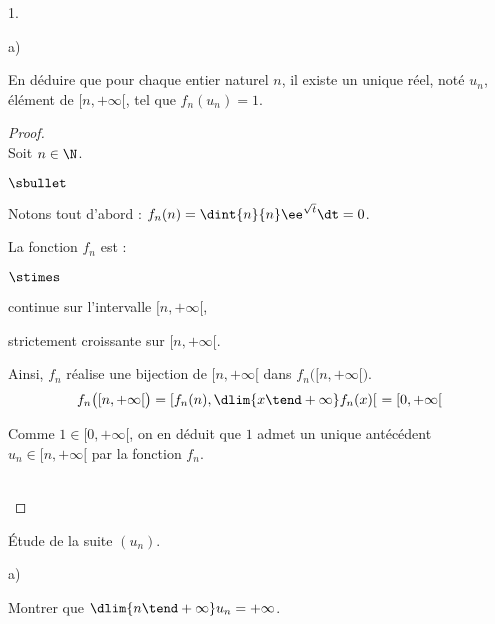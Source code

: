\documentclass[11pt]{article}%
\begin{document}
\begin{noliste}{1.}
\begin{noliste}{a)}
  \item En déduire que pour chaque entier naturel $n$, il existe un
    unique réel, noté $u_n$, élément de $[n, + \infty[$, tel que
    $f_{n}(u_n) = 1$.

    \begin{proof}~\\
      Soit $n \in \N$.
      \begin{noliste}{$\sbullet$}
      \item Notons tout d'abord : $f_n(n) = \dint{n}{n}
        \ee^{\sqrt{t}}\dt = 0$.

      \item La fonction $f_n$ est :
        \begin{noliste}{$\stimes$}
        \item continue sur l'intervalle $[n,+\infty[$,
        \item strictement croissante sur $[n,+\infty[$.
        \end{noliste}
        Ainsi, $f_n$ réalise une bijection de $[n,+\infty[$ dans
        $f_n\big([n,+\infty[\big)$.
        \[
        f_n\big([n,+\infty[\big) = [f_n(n), \dlim{x \tend +\infty}
        f_n(x) [ \ = [0, +\infty[
        \]

      \item Comme $1 \in [0, +\infty[$, on en déduit que $1$ admet un
        unique antécédent $u_n \in [n, +\infty[$ par la fonction
        $f_n$.
      \end{noliste}
      \conc{Ainsi, il existe un unique réel $u_n\in[n,+\infty[$ tel
        que $f_n(u_n) = 1$.}~\\[-1.2cm]
    \end{proof}
  \end{noliste}

\item Étude de la suite $(u_n)$.
  \begin{noliste}{a)}
    \setlength{\itemsep}{2mm}
  \item Montrer que $\dlim{n \tend +\infty} u_n = +\infty$.


\end{noliste}
\end{noliste}
\end{document}

